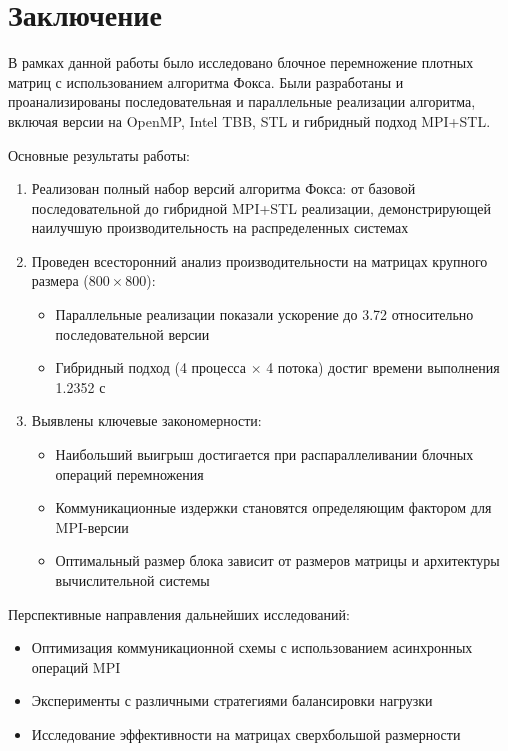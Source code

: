 \documentclass[12pt]{article}
\begin{document}
\newpage
\section{Заключение}
В рамках данной работы было исследовано блочное перемножение плотных матриц с использованием алгоритма Фокса. Были разработаны и проанализированы последовательная и параллельные реализации алгоритма, включая версии на OpenMP, Intel TBB, STL и гибридный подход MPI+STL.

Основные результаты работы:
\begin{enumerate}
    \item Реализован полный набор версий алгоритма Фокса: от базовой последовательной до гибридной MPI+STL реализации, демонстрирующей наилучшую производительность на распределенных системах
    
    \item Проведен всесторонний анализ производительности на матрицах крупного размера ($800 \times 800$):
    \begin{itemize}
        \item Параллельные реализации показали ускорение до 3.72 относительно последовательной версии
        \item Гибридный подход (4 процесса $\times$ 4 потока) достиг времени выполнения 1.2352 с
    \end{itemize}
    
    \item Выявлены ключевые закономерности:
    \begin{itemize}
        \item Наибольший выигрыш достигается при распараллеливании блочных операций перемножения
        \item Коммуникационные издержки становятся определяющим фактором для MPI-версии
        \item Оптимальный размер блока зависит от размеров матрицы и архитектуры вычислительной системы
    \end{itemize}
\end{enumerate}

Перспективные направления дальнейших исследований:
\begin{itemize}
    \item Оптимизация коммуникационной схемы с использованием асинхронных операций MPI
    \item Эксперименты с различными стратегиями балансировки нагрузки
    \item Исследование эффективности на матрицах сверхбольшой размерности
\end{itemize}
\end{document}
